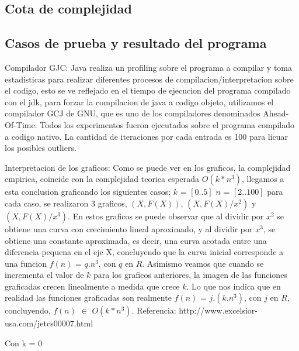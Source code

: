 \subsection{Cota de complejidad} \label{ej_3:cota}



\subsection{Casos de prueba y resultado del programa} \label{ej_3:casos}

Compilador GJC: Java realiza un profiling sobre el programa a compilar y toma estadisticas para realizar diferentes procesos de compilacion/interpretacion sobre el codigo, esto se ve reflejado en el tiempo de ejecucion del programa compilado con el jdk, para forzar la compilacion de java a codigo objeto, utilizamos el compilador GCJ de GNU, que es uno de los compiladores denominados Ahead-Of-Time. Todos los experimentos fueron ejecutados sobre el programa compilado a codigo nativo. La cantidad de iteraciones por cada entrada es 100 para licuar los posibles outliers.

\vspace{2mm}

Interpretacion de los graficos: Como se puede ver en los graficos, la complejidad empirica, coincide con la complejidad teorica esperada $O(k*n^3)$, llegamos a esta conclusion graficando los siguientes casos: $k$ = $[0..5]$ $n$ = $[2..100]$ para cada caso, se realizaron 3 graficos, $(X,F(X))$,  $(X,F(X)/x^2)$ y $(X,F(X)/x^3)$. En estos graficos se puede observar que al dividir por $x^2$ se obtiene una curva con crecimiento lineal aproximado, y al dividir por $x^3$, se obtiene una constante aproximada, es decir, una curva acotada entre una diferencia pequena en el eje X, concluyendo que la curva inicial corresponde a una funcion $f(n)$ = $q.n^3$, con $q$ en $R$. Asimismo veamos que cuando se incrementa el valor de $k$ para los graficos anteriores, la imagen de las funciones graficadas crecen linealmente a medida que crece $k$. Lo que nos indica que en realidad las funciones graficadas son realmente $f(n)$ = $j.(k.n^3)$, con $j$ en $R$, concluyendo, $f(n)$ $\in$ $O(k*n^3)$. Referencia: http://www.excelsior-usa.com/jetcs00007.html

\vspace{2mm}

Con k = 0

